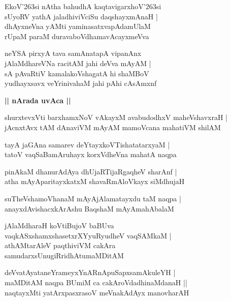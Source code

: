 \documentclass[twoside,12pt,openright]{book}
\def\S{\char'263}
\newcounter{shloka}[chapter]
\def\uvaca#1{\centerline{{\large\textbf{#1}}}}
\begin{document}
\begin{shloka}%
EkoV\S si nAtha bahudhA kaqtavigarxhoV\S si \\
sUyoRV yathA jaladhiviVciSu daqshayxmAnaH |\\
dhAyxneVna yAMti yaminasatxvapAdamUlaM \\
rUpaM paraM duravaboVdhamavAcayxmeVva
\end{shloka}

\begin{shloka}%
neYSA pirxyA tava samAnatapA vipanAnx \\
jAlaMdhareVNa racitAM jahi deVva mAyAM |\\
sA pAvaRtiV kamalakoVshagatA hi shaMBoV \\
yudhayxsavx veYrinivahaM jahi pAhi cAsAmxnf
\end{shloka}

\uvaca{|| nArada uvAca ||}

\begin{shloka}%
shurxtevxVti barxhamxNoV vAkayxM avabudodhxV maheVshavxraH |\\
jAcnxtAvx tAM dAnaviVM mAyAM mamoVcana mahatiVM shilAM 
\end{shloka}

\begin{shloka}%
tayA jaGAna samarev deYtayxkoVTishatatarxyaM |\\
tatoV vaqSaBamAruhayx korxVdheVna mahatA naqpa
\end{shloka}

\begin{shloka}%
pinAkaM dhanurAdAya dhUjaRTijaRgaqheV sharAnf |\\
atha mAyAparitayxkatxM shavaRmAloVkayx siMdhujaH 
\end{shloka}

\begin{shloka}%
suTheVshamoVhanaM mAyAjAlamatayxdu taM naqpa |\\
anayxdAvishacxkArAshu BaqshaM mAyAmahAbalaM 
\end{shloka}

\begin{shloka}%
jAlaMdharaH koVtiBujoV baBUva \\
vaqkASxshamxshasetxrXYyuRyudheV vaqSAMkaM |\\
athAMtarAleV paqthiviVM cakAra \\
samudarxsUnugiRridhAtumaMDitAM
\end{shloka}

\begin{shloka}%
deVvatAyataneYrameyxYnARnApuSapxsamAkuleYH |\\
maMDitAM naqpa BUmiM ca cakAroVdadhinaMdanaH ||\\
naqtayxMti yatArxpasxrasoV meVnakAdAyx manovharAH
\end{shloka}
\end{document}
